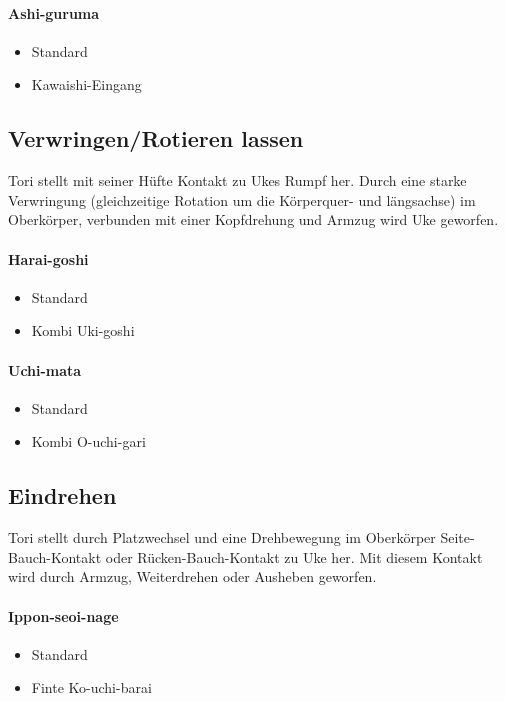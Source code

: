 \documentclass[justified, a4paper, notitlepage, captions=tableheading, nobib]{tufte-handout}
\begin{document}
\paragraph{Ashi-guruma }
\label{sec:org407cf5d}
\begin{itemize}
\item Standard
\item Kawaishi-Eingang
\end{itemize}

\subsection{Verwringen/Rotieren lassen }
\label{sec:org2170965}
Tori stellt mit seiner Hüfte Kontakt zu Ukes Rumpf her. Durch eine starke Verwringung (gleichzeitige Rotation um die Körperquer- und längsachse) im Oberkörper, verbunden mit einer Kopfdrehung und Armzug wird Uke geworfen.

\paragraph{Harai-goshi }
\label{sec:orge3f8ff7}
\begin{itemize}
\item Standard
\item Kombi Uki-goshi
\end{itemize}

\paragraph{Uchi-mata }
\label{sec:org7adacfb}
\begin{itemize}
\item Standard
\item Kombi O-uchi-gari
\end{itemize}

\subsection{Eindrehen }
\label{sec:org0386b3b}
Tori stellt durch Platzwechsel und eine Drehbewegung im Oberkörper Seite-Bauch-Kontakt oder Rücken-Bauch-Kontakt zu Uke her. Mit diesem Kontakt wird durch Armzug, Weiterdrehen oder Ausheben geworfen.

\paragraph{Ippon-seoi-nage }
\label{sec:org2ec5dd7}
\begin{itemize}
\item Standard
\item Finte Ko-uchi-barai
\end{itemize}
\end{document}
